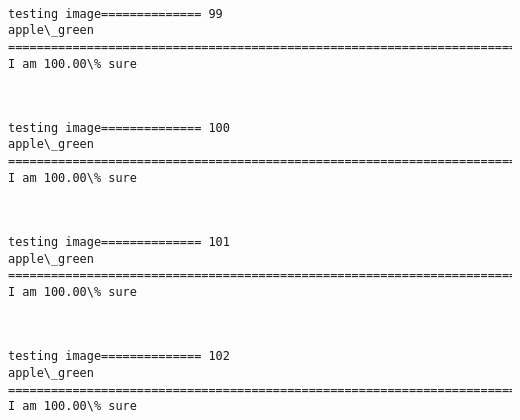 \documentclass[11pt]{article}
\begin{document}
    \begin{center}
    \end{center}
    { \hspace*{\fill} \\}
    
    \begin{Verbatim}[commandchars=\\\{\}]
testing image============== 99
apple\_green
============================================================================
I am 100.00\% sure

    \end{Verbatim}

    \begin{center}
    \end{center}
    { \hspace*{\fill} \\}
    
    \begin{Verbatim}[commandchars=\\\{\}]
testing image============== 100
apple\_green
============================================================================
I am 100.00\% sure

    \end{Verbatim}

    \begin{center}
    \end{center}
    { \hspace*{\fill} \\}
    
    \begin{Verbatim}[commandchars=\\\{\}]
testing image============== 101
apple\_green
============================================================================
I am 100.00\% sure

    \end{Verbatim}

    \begin{center}
    \end{center}
    { \hspace*{\fill} \\}
    
    \begin{Verbatim}[commandchars=\\\{\}]
testing image============== 102
apple\_green
============================================================================
I am 100.00\% sure

    \end{Verbatim}
\end{document}
